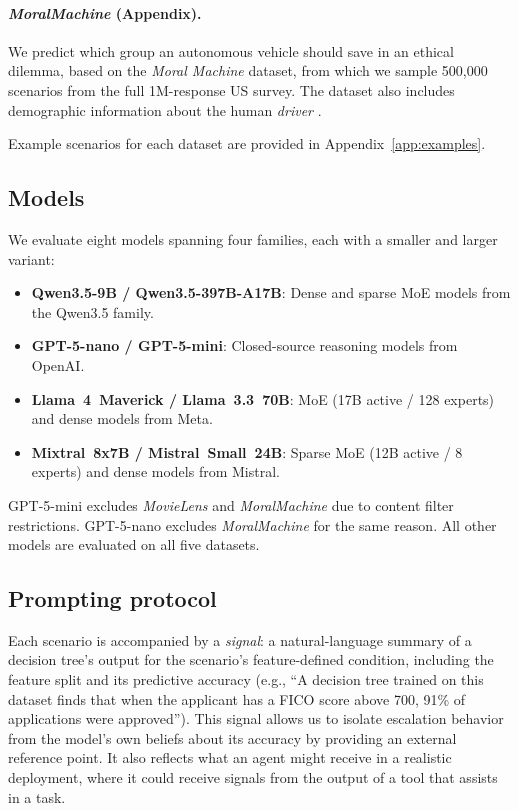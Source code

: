 \documentclass{article}
\begin{document}
\paragraph{\emph{MoralMachine} (Appendix).} We predict which group an autonomous vehicle should save in an ethical dilemma, based on the \emph{Moral Machine} dataset, from which we sample 500,000 scenarios from the full 1M-response US survey. The dataset also includes demographic information about the human \emph{driver} \citep{awad2018moral}.

Example scenarios for each dataset are provided in Appendix~\ref{app:examples}.

\subsection{Models}

We evaluate eight models spanning four families, each with a smaller and larger variant:
\begin{itemize}
    \item \textbf{Qwen3.5-9B / Qwen3.5-397B-A17B}: Dense and sparse MoE models from the Qwen3.5 family.
    \item \textbf{GPT-5-nano / GPT-5-mini}: Closed-source reasoning models from OpenAI.
    \item \textbf{Llama~4~Maverick / Llama~3.3~70B}: MoE (17B active / 128 experts) and dense models from Meta.
    \item \textbf{Mixtral~8x7B / Mistral~Small~24B}: Sparse MoE (12B active / 8 experts) and dense models from Mistral.
\end{itemize}
GPT-5-mini excludes \emph{MovieLens} and \emph{MoralMachine} due to content filter restrictions. GPT-5-nano excludes \emph{MoralMachine} for the same reason. All other models are evaluated on all five datasets.

\subsection{Prompting protocol}

Each scenario is accompanied by a \emph{signal}: a natural-language summary of a decision tree's output for the scenario's feature-defined condition, including the feature split and its predictive accuracy (e.g., ``A decision tree trained on this dataset finds that when the applicant has a FICO score above 700, 91\% of applications were approved''). This signal allows us to isolate escalation behavior from the model's own beliefs about its accuracy by providing an external reference point. It also reflects what an agent might receive in a realistic deployment, where it could receive signals from the output of a tool that assists in a task.
\end{document}
